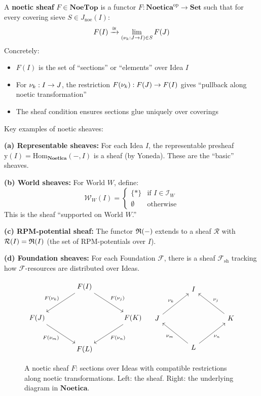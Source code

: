 \begin{definition}
\label{def:noetic-sheaf}
A \textbf{noetic sheaf} $F \in \mathbf{NoeTop}$ is a functor
$F : \mathbf{Noetica}^{\mathrm{op}} \to \mathbf{Set}$ such that for every
covering sieve $S \in J_{\mathrm{noe}}(I)$:
\[
  F(I) \xrightarrow{\cong} \lim_{(\nu_{k} : J \to I) \in S} F(J)
\]
Concretely:
\begin{itemize}
  \item $F(I)$ is the set of ``sections'' or ``elements'' over Idea $I$
  \item For $\nu_{k} : I \to J$, the restriction $F(\nu_{k}) : F(J) \to F(I)$
        gives ``pullback along noetic transformation''
  \item The sheaf condition ensures sections glue uniquely over coverings
\end{itemize}
\end{definition}

\begin{example}
\label{ex:canonical-noetic-sheaves}
Key examples of noetic sheaves:

\textbf{(a) Representable sheaves:} For each Idea $I$, the representable presheaf
$\mathrm{y}(I) = \mathrm{Hom}_{\mathbf{Noetica}}(-, I)$ is a sheaf (by Yoneda).
These are the ``basic'' sheaves.

\textbf{(b) World sheaves:} For World $W$, define:
\[
  \mathcal{W}_W(I) = \begin{cases}
    \{*\} & \text{if } I \in \mathcal{I}_W \\
    \emptyset & \text{otherwise}
  \end{cases}
\]
This is the sheaf ``supported on World $W$.''

\textbf{(c) RPM-potential sheaf:} The functor $\mathfrak{R}(-)$ extends to a sheaf
$\mathcal{R}$ with $\mathcal{R}(I) = \mathfrak{R}(I)$ (the set of RPM-potentials over $I$).

\textbf{(d) Foundation sheaves:} For each Foundation $\mathcal{F}$, there is a
sheaf $\mathcal{F}_{\mathrm{sh}}$ tracking how $\mathcal{F}$-resources are
distributed over Ideas.
\end{example}

\begin{figure}[ht]
\centering
\[
\begin{tikzcd}[row sep=large, column sep=large]
  & F(I) \arrow[dl, "F(\noe{k})"'] \arrow[dr, "F(\noe{j})"] & \\
  F(J) \arrow[dr, "F(\noe{m})"'] & & F(K) \arrow[dl, "F(\noe{n})"] \\
  & F(L) &
\end{tikzcd}
\quad
\begin{tikzcd}[row sep=large, column sep=large]
  & I & \\
  J \arrow[ur, "\noe{k}"] & & K \arrow[ul, "\noe{j}"'] \\
  & L \arrow[ul, "\noe{m}"] \arrow[ur, "\noe{n}"'] &
\end{tikzcd}
\]
\caption{A noetic sheaf $F$: sections over Ideas with compatible restrictions
along noetic transformations. Left: the sheaf. Right: the underlying diagram in $\mathbf{Noetica}$.}
\label{fig:noetic-sheaf}
\end{figure}

